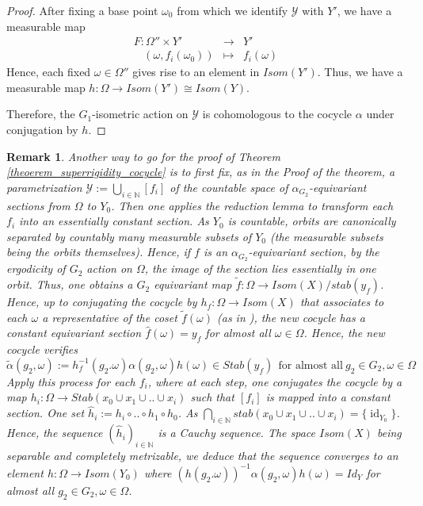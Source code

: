 \documentclass{amsart}
\numberwithin{equation}{section}
\newtheorem{rmk}[thm]{Remark}
\DeclareMathOperator{\id}{id}
\newcommand{\YY}{\mathcal{Y}}     %
\newcommand{\NN}{\mathbb{N}}      %
\theoremstyle{definition}
\begin{document}
\begin{proof}
After fixing a base point $\omega_0$ from which we identify $\YY$ with $Y'$, we have a measurable map 
\begin{eqnarray*}
    F:\Omega'' \times Y' &\rightarrow & Y'\\
\ \ \ \ (\omega,f_i(\omega_0)) &\mapsto & f_i(\omega)
    \end{eqnarray*}
Hence, each fixed $\omega\in\Omega''$ gives rise to an element in $Isom(Y')$. Thus, we have a measurable map $h:\Omega\rightarrow Isom(Y')\cong Isom(Y)$.\par 
Therefore, the $G_1$-isometric action on $\YY$ is cohomologous to the cocycle $\alpha$ under conjugation by $h$.
\end{proof}

\begin{rmk}
    Another way to go for the proof of Theorem \ref{theoerem_superrigidity_cocycle} is to first fix, as in the Proof of the theorem, a parametrization  $\YY:=\displaystyle{\bigcup_{i\in\NN}[f_i]}$ of the countable space of $\alpha_{G_2}$-equivariant sections from $\Omega$ to $Y_0$. Then one applies the reduction lemma to transform each $f_i$ into an essentially constant section. As $Y_0$ is countable, orbits are canonically separated by countably many measurable subsets of $Y_0$ (the measurable subsets being the orbits themselves). Hence, if $f$ is an  $\alpha_{G_2} $-equivariant section, by the ergodicity of $G_2$ action on $\Omega$, the image of the section lies essentially in one orbit. Thus, one obtains a $G_2$ equivariant map $\tilde{f}:\Omega\rightarrow Isom(X)/stab(y_f)$.  Hence, up to conjugating the cocycle by $h_f:\Omega\rightarrow Isom(X)$ that associates to each $ \omega$ a representative of the coset $\tilde{f}(\omega)$ (as in \cite[Example 4.2.18 (b)]{Zimmer}), the new cocycle has a constant equivariant section $\hat{f}(\omega)=y_f$ for almost all $\omega\in \Omega$. Hence, the new cocycle verifies 
    \[
    \tilde{\alpha}(g_2,\omega):=h_f^{-1}(g_2.\omega)\alpha(g_2,\omega)h(\omega)\in Stab(y_f)\ \ \text{for almost all}\ g_2\in G_2,\omega\in \Omega
    \]
   Apply this process for each $f_i$, where at each step, one conjugates the cocycle by a map $h_i:\Omega\rightarrow Stab(x_0\cup x_1\cup ..\cup x_i)$ such that $[f_i]$ is mapped into a constant section. One set $\hat{h}_i:=h_i\circ ..\circ 
    h_1\circ h_0$. As $\displaystyle{\bigcap_{i\in\NN} stab(x_0\cup x_1\cup ..\cup x_i)=\{\id_{Y_0}\}}$. Hence, the sequence $(\hat{h}_i)_{i\in\NN}$ is a Cauchy sequence. The space $Isom(X)$ being separable and completely metrizable, we deduce that the sequence converges to an element $h:\Omega\rightarrow Isom(Y_0)$ where $(h(g_2.\omega))^{-1}\alpha(g_2,\omega)h(\omega)=Id_Y$ for almost all $g_2\in G_2, \omega\in \Omega$. 
\end{rmk}
\end{document}
